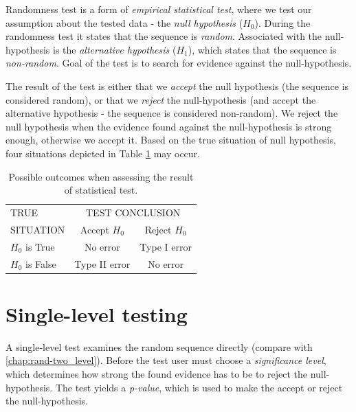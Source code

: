 \documentclass[
  digital,     %
  oneside,     %
  nosansbold,  %
  nocolorbold, %
  nolof,         %
  nolot,         %
]{fithesis4}
\begin{document}

Randomness test is a form of \emph{empirical statistical test}, where we test our assumption about the tested data - the \emph{null hypothesis} ($H_0$). During the randomness test it states that the sequence is \emph{random}. Associated with the null-hypothesis is the \emph{alternative hypothesis} ($H_1$), which states that the sequence is \emph{non-random}. Goal of the test is to search for evidence against the null-hypothesis. \cite[p. 2]{tu01_guide}



The result of the test is either that we \emph{accept} the null hypothesis (the sequence is considered random), or that we \emph{reject} the null-hypothesis (and accept the alternative hypothesis - the sequence is considered non-random). We reject the null hypothesis when the evidence found against the null-hypothesis is strong enough, otherwise we accept it. Based on the true situation of null hypothesis, four situations depicted in Table \ref{tab:type_errors} may occur. \cite[p. 417]{basic_practice}

\begin{table}
  \begin{tabularx}{0.7\textwidth}{l|c|c}
    TRUE  & \multicolumn{2}{c}{TEST CONCLUSION}\\
    SITUATION &Accept $H_0$ & Reject $H_0$\\
    \midrule
    $H_0$ is True &  No error & Type I error  \\
    $H_0$ is False & Type II error & No error \\
  \end{tabularx}
  \caption{Possible outcomes when assessing the result of statistical test.}
  \label{tab:type_errors}
\end{table}

\section{Single-level testing} \label{chap:rand-single}

A single-level test examines the random sequence directly (compare with \ref{chap:rand-two_level}). Before the test user must choose a \emph{significance level}, which determines how strong the found evidence has to be to reject the null-hypothesis. The test yields a \emph{p-value}, which is used to make the accept or reject the null-hypothesis.
\end{document}
